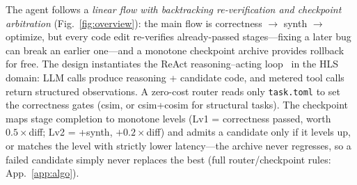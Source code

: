 \documentclass[10pt,conference,letterpaper]{IEEEtran}
\begin{document}
The agent follows a \emph{linear flow with backtracking re-verification and checkpoint arbitration} (Fig.~\ref{fig:overview}): the main flow is correctness $\rightarrow$ synth $\rightarrow$ optimize, but every code edit re-verifies already-passed stages---fixing a later bug can break an earlier one---and a monotone checkpoint archive provides rollback for free. The design instantiates the ReAct reasoning--acting loop~\cite{react} in the HLS domain: LLM calls produce reasoning + candidate code, and metered tool calls return structured observations. A zero-cost router reads only \texttt{task.toml} to set the correctness gates (csim, or csim+cosim for structural tasks). The checkpoint maps stage completion to monotone levels (Lv1 = correctness passed, worth $0.5\times$diff; Lv2 = +synth, $+0.2\times$diff) and admits a candidate only if it levels up, or matches the level with strictly lower latency---the archive never regresses, so a failed candidate simply never replaces the best (full router/checkpoint rules: App.~\ref{app:algo}).
\end{document}
